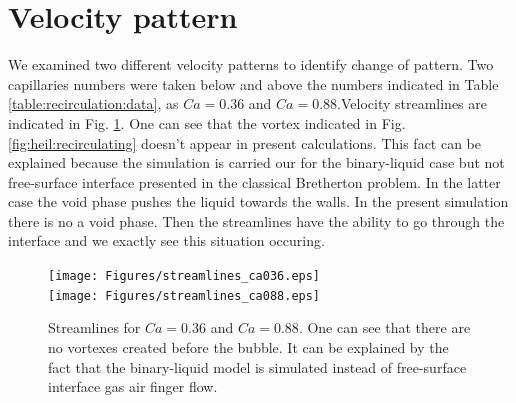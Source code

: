 \documentclass{article}
\begin{document}
\section{Velocity pattern}
We examined two different velocity patterns to identify change of pattern. Two capillaries numbers
were taken below and above the numbers indicated in Table \ref{table:recirculation:data}, as
$Ca=0.36$ and $Ca=0.88$.Velocity streamlines are
indicated in Fig. \ref{fig:streamlines:pattern}. One can see that the vortex indicated in
Fig.\ref{fig:heil:recirculating} doesn't appear in present calculations. This fact can be
explained because the simulation is carried our for the binary-liquid case but not free-surface
interface presented in the classical Bretherton problem. In the latter case the void phase pushes
the liquid towards the walls. In the present simulation there is no a void phase. Then the
streamlines have the ability to go through the interface and we exactly see this situation occuring.
\begin{figure}[ht]
\texttt{[image: Figures/streamlines\_ca036.eps]}\\
\texttt{[image: Figures/streamlines\_ca088.eps]}
\caption{Streamlines for $Ca=0.36$ and $Ca=0.88$. One can see that there are no vortexes created
before the bubble. It can be explained by the fact that the binary-liquid model is simulated
instead of free-surface interface gas air finger flow.\label{fig:streamlines:pattern}}
\end{figure}
\end{document}
